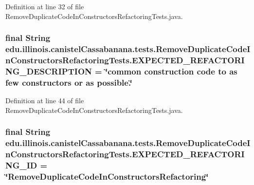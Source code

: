 Definition at line 32 of file RemoveDuplicateCodeInConstructorsRefactoringTests.java.

\hypertarget{classedu_1_1illinois_1_1canistelCassabanana_1_1tests_1_1RemoveDuplicateCodeInConstructorsRefactoringTests_a093baeba2e5e938d962b85eb72b91f41}{
\subsubsection[{EXPECTED\_\-REFACTORING\_\-DESCRIPTION}]{\setlength{\rightskip}{0pt plus 5cm}final String {\bf edu.illinois.canistelCassabanana.tests.RemoveDuplicateCodeInConstructorsRefactoringTests.EXPECTED\_\-REFACTORING\_\-DESCRIPTION} = \char`\"{}common construction code to as few constructors or as possible.\char`\"{}}}
\label{classedu_1_1illinois_1_1canistelCassabanana_1_1tests_1_1RemoveDuplicateCodeInConstructorsRefactoringTests_a093baeba2e5e938d962b85eb72b91f41}


Definition at line 44 of file RemoveDuplicateCodeInConstructorsRefactoringTests.java.

\hypertarget{classedu_1_1illinois_1_1canistelCassabanana_1_1tests_1_1RemoveDuplicateCodeInConstructorsRefactoringTests_afaed708bee891f511d416153a09b2822}{
\subsubsection[{EXPECTED\_\-REFACTORING\_\-ID}]{\setlength{\rightskip}{0pt plus 5cm}final String {\bf edu.illinois.canistelCassabanana.tests.RemoveDuplicateCodeInConstructorsRefactoringTests.EXPECTED\_\-REFACTORING\_\-ID} = \char`\"{}RemoveDuplicateCodeInConstructorsRefactoring\char`\"{}}}
\label{classedu_1_1illinois_1_1canistelCassabanana_1_1tests_1_1RemoveDuplicateCodeInConstructorsRefactoringTests_afaed708bee891f511d416153a09b2822}


